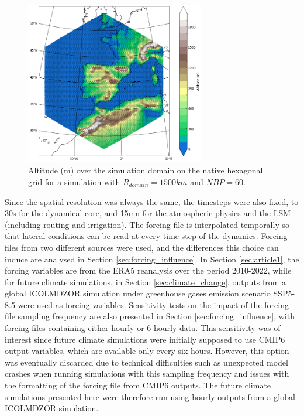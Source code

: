 \begin{figure}[hbtp]
    \centering
    \includegraphics[width=0.7\textwidth]{images/chap4/article/f01.png}
    \caption{Altitude (m) over the simulation domain on the native hexagonal grid for a simulation with $R_{domain}=1500 km$ and $NBP=60$.}
    \label{fig:domain_full_hex}
\end{figure}

Since the spatial resolution was always the same, the timesteps were also fixed, to 30s for the dynamical core, and 15mn for the atmospheric physics and the LSM (including routing and irrigation).
The forcing file is interpolated temporally so that lateral conditions can be read at every time step of the dynamics.
Forcing files from two different sources were used, and the differences this choice can induce are analysed in Section \ref{sec:forcing_influence}. In Section \ref{sec:article1}, the forcing variables are from the ERA5 reanalysis over the period 2010-2022, while for future climate simulations, in Section \ref{sec:climate_change}, outputs from a global ICOLMDZOR simulation under greenhouse gases emission scenario SSP5-8.5 were used as forcing variables.
Sensitivity tests on the impact of the forcing file sampling frequency are also presented in Section \ref{sec:forcing_influence}, with forcing files containing either hourly or 6-hourly data.
This sensitivity was of interest since future climate simulations were initially supposed to use CMIP6 output variables, which are available only every six hours. However, this option was eventually discarded due to technical difficulties such as unexpected model crashes when running simulations with this sampling frequency and issues with the formatting of the forcing file from CMIP6 outputs. The future climate simulations presented here were therefore run using hourly outputs from a global ICOLMDZOR simulation.

